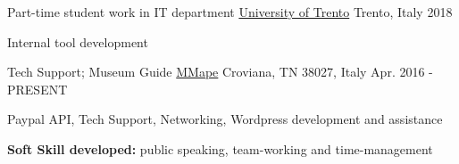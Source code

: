 \begin{cventries}
  \cventry
{Part-time student work in IT department} %
{\href{https://www.unitn.it}{University of Trento}} %
{Trento, Italy} %
{2018} %
{
  \begin{cvitems} %
    \item {Internal tool development}
  \end{cvitems}
  }

\cventry
{Tech Support; Museum Guide} %
{\href{https://www.mmape.it}{MMape}} %
{Croviana, TN 38027, Italy} %
{Apr. 2016 - PRESENT} %
{
  \begin{cvitems} %
    \item {Paypal API, Tech Support, Networking, Wordpress development and assistance}
    \item {\textbf{Soft Skill developed:} public speaking, team-working and time-management}
  \end{cvitems}
}



\end{cventries}

